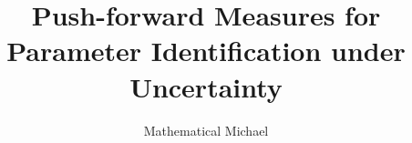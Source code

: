 \documentclass[final]{beamer}
\title{Push-forward Measures for Parameter Identification under Uncertainty}
\author{\color{black} Mathematical Michael}
\institute[shortinst]{\color{black} University of Colorado: Denver}
\newlength{\sepwidth}
\newlength{\colwidth}
\newcommand{\separatorcolumn}{\begin{column}{\sepwidth}\end{column}}
\begin{document}
\begin{frame}[t]
\begin{columns}[t]
\separatorcolumn

\begin{column}{\colwidth}

  
  \vspace{-0.5cm}
  

\end{column}

\separatorcolumn

\begin{column}{\colwidth}

  

\end{column}

\separatorcolumn

\begin{column}{\colwidth}

  
  
\end{column}

\separatorcolumn
\end{columns}
\end{frame}
\end{document}
